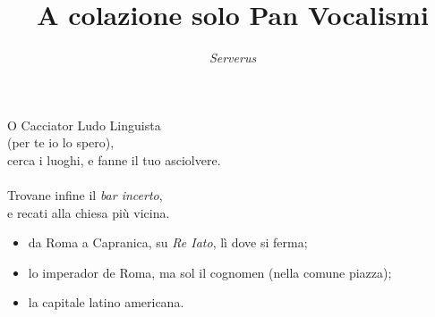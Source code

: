 \documentclass{article}
\title{A colazione solo Pan Vocalismi}
\author{\it Serverus}
\date{}
\begin{document}
\maketitle
O Cacciator Ludo Linguista\\
(per te io lo spero),\\
cerca i luoghi, e fanne il tuo asciolvere.\\
\ \\
Trovane infine il \textit{bar incerto},\\
e recati alla chiesa più vicina.\\
\begin{itemize}
    \item da Roma a Capranica, su \textit{Re Iato}, lì dove si ferma;
    \item lo imperador de Roma, ma sol il cognomen (nella comune piazza);
    \item la capitale latino americana.
\end{itemize}{}
\end{document}
